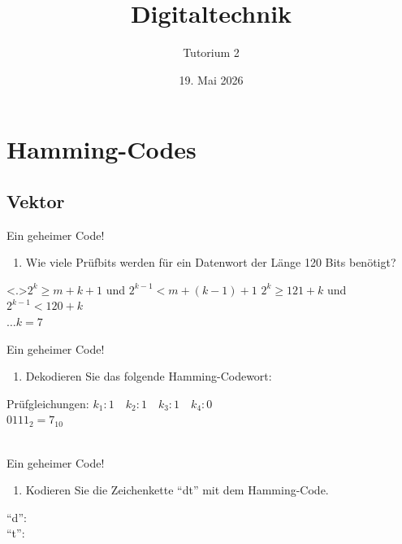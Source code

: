 \documentclass[aspectratio=169,usepdftitle=true,11pt,ngerman,t]{beamer}
\subtitle{Tutorium 2}
\date{19. Mai 2026}
\title{Digitaltechnik}
\begin{document}
\section[\(k_1, k_2, m_1, \dots \)]{Hamming-Codes}
\subsection{Vektor}

\begin{frame}{Ein geheimer Code!}\onslide<+->
    \begin{exercise}
        \begin{enumerate}
            \item[1.] Wie viele Prüfbits werden für ein Datenwort der Länge 120 Bits benötigt?
        \end{enumerate}
    \end{exercise}\onslide<+->
    \begin{solve}
        \only<.>{\(2^k\geq m+k+1\) und \(2^{k-1}<m+(k-1)+1\)}
        \onslide<+->\(2^k\geq 121+k\) und \(2^{k-1}<120+k\)\onslide<+->\\
        \(\dots k=7\)
    \end{solve}
\end{frame}
\resetframecounters%

\begin{frame}{Ein geheimer Code!}\onslide<+->
    \begin{exercise}
        \begin{enumerate}
            \item[2.] Dekodieren Sie das folgende Hamming-Codewort: 
        \end{enumerate}
    \end{exercise}\onslide<+->
    \begin{solve}
        Prüfgleichungen: \(k_1: 1\quad k_2: 1\quad k_3: 1\quad k_4: 0\) \onslide<+->\\
        \(0111_2 = 7_{10}\) \onslide<+->\\
        \faAngleRight~
    \end{solve}
\end{frame}
\resetframecounters%

\begin{frame}{Ein geheimer Code!}\onslide<+->
    \begin{exercise}
        \begin{enumerate}
            \item[3.] Kodieren Sie die Zeichenkette \enquote{dt} mit dem Hamming-Code.
        \end{enumerate}
    \end{exercise}\onslide<+->
    \begin{solve}
        \enquote{d}: \onslide<+->\\
        \enquote{t}: \onslide<+->\onslide<+->\\
    \end{solve}
\end{frame}
\end{document}
